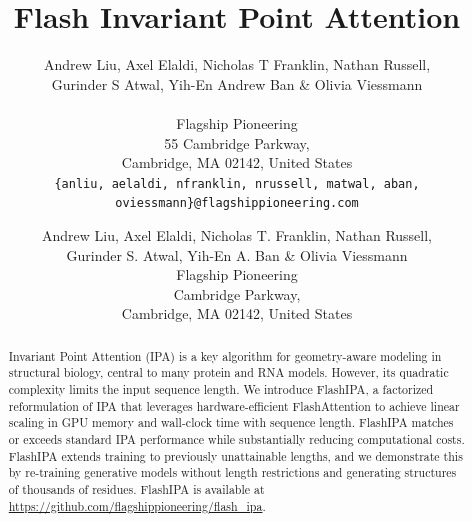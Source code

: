 \documentclass{article}
\title{Flash Invariant Point Attention}
\author{
\parbox{\linewidth}{\centering Andrew Liu, Axel Elaldi, Nicholas T Franklin, Nathan Russell, \\ Gurinder S Atwal, Yih-En Andrew Ban \& Olivia Viessmann}\\[2ex]
Flagship Pioneering \\
55 Cambridge Parkway,\\
Cambridge, MA 02142, United States\\
\texttt{\{anliu, aelaldi, nfranklin, nrussell, matwal, aban, oviessmann\}@flagshippioneering.com}}
\author{
  \begin{tabular}{c}
    Andrew Liu, Axel Elaldi, Nicholas T. Franklin, Nathan Russell, \\ Gurinder S. Atwal, Yih-En A. Ban \& Olivia Viessmann \\[2ex]
    Flagship Pioneering \\
    \normalfont 55 Cambridge Parkway,\\
    \normalfont Cambridge, MA 02142, United States\\
  \end{tabular}
}
\begin{document}
\maketitle


\begin{abstract}
Invariant Point Attention (IPA) is a key algorithm for geometry-aware modeling in structural biology, central to many protein and RNA models. However, its quadratic complexity limits the input sequence length. We introduce FlashIPA, a factorized reformulation of IPA that leverages hardware-efficient FlashAttention to achieve linear scaling in GPU memory and wall-clock time with sequence length. FlashIPA matches or exceeds standard IPA performance while substantially reducing computational costs. FlashIPA extends training to previously unattainable lengths, and we demonstrate this by re-training generative models without length restrictions and generating structures of thousands of residues. FlashIPA is available at \url{https://github.com/flagshippioneering/flash_ipa}.
\end{abstract}
\end{document}
